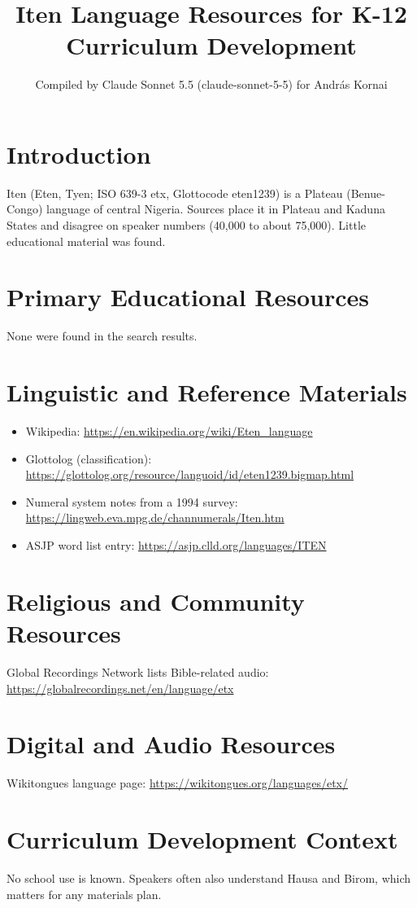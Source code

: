 \documentclass[12pt]{article}
\title{Iten Language Resources for K-12 Curriculum Development}
\author{Compiled by Claude Sonnet 5.5 (claude-sonnet-5-5) for Andr\'as Kornai}
\date{}
\begin{document}
\maketitle
\section{Introduction}
Iten (Eten, Tyen; ISO 639-3 etx, Glottocode eten1239) is a Plateau (Benue-Congo) language of central Nigeria. Sources place it in Plateau and Kaduna States and disagree on speaker numbers (40,000 to about 75,000). Little educational material was found.
\section{Primary Educational Resources}
None were found in the search results.
\section{Linguistic and Reference Materials}
\begin{itemize}
\item Wikipedia: \url{https://en.wikipedia.org/wiki/Eten_language}
\item Glottolog (classification): \url{https://glottolog.org/resource/languoid/id/eten1239.bigmap.html}
\item Numeral system notes from a 1994 survey: \url{https://lingweb.eva.mpg.de/channumerals/Iten.htm}
\item ASJP word list entry: \url{https://asjp.clld.org/languages/ITEN}
\end{itemize}
\section{Religious and Community Resources}
Global Recordings Network lists Bible-related audio: \url{https://globalrecordings.net/en/language/etx}
\section{Digital and Audio Resources}
Wikitongues language page: \url{https://wikitongues.org/languages/etx/}
\section{Curriculum Development Context}
No school use is known. Speakers often also understand Hausa and Birom, which matters for any materials plan.
\end{document}

